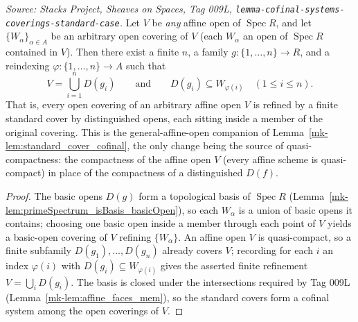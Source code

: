 \begin{lemma}\label{mk-lem:standard_cover_cofinal_affine}
  \leanok

  \textit{Source: Stacks Project, Sheaves on Spaces, Tag 009L,
  \texttt{lemma-cofinal-systems-coverings-standard-case}.}
  Let \(V\) be \emph{any} affine open of \(\operatorname{Spec} R\), and let \(\{W_\alpha\}_{\alpha \in A}\)
  be an arbitrary open covering of \(V\) (each \(W_\alpha\) an open of \(\operatorname{Spec} R\) contained
  in \(V\)). Then there exist a finite \(n\), a family \(g : \{1, \dots, n\} \to R\), and a reindexing
  \(\varphi : \{1, \dots, n\} \to A\) such that
  \[
    V = \bigcup_{i=1}^n D(g_i)
    \qquad\text{and}\qquad
    D(g_i) \subseteq W_{\varphi(i)} \quad (1 \le i \le n).
  \]
  That is, every open covering of an arbitrary affine open \(V\) is refined by a finite standard cover by
  distinguished opens, each sitting inside a member of the original covering. This is the
  general-affine-open companion of Lemma~\ref{mk-lem:standard_cover_cofinal}, the only change being the source
  of quasi-compactness: the compactness of the affine open \(V\) (every affine scheme is quasi-compact) in
  place of the compactness of a distinguished \(D(f)\).
\end{lemma}
\begin{proof}
  \leanok
  The basic opens \(D(g)\) form a topological basis of \(\operatorname{Spec} R\)
  (Lemma~\ref{mk-lem:primeSpectrum_isBasis_basicOpen}), so each \(W_\alpha\) is a union of basic opens it
  contains; choosing one basic open inside a member through each point of \(V\) yields a basic-open covering
  of \(V\) refining \(\{W_\alpha\}\). An affine open \(V\) is quasi-compact, so a finite subfamily
  \(D(g_1), \dots, D(g_n)\) already covers \(V\); recording for each \(i\) an index \(\varphi(i)\) with
  \(D(g_i) \subseteq W_{\varphi(i)}\) gives the asserted finite refinement \(V = \bigcup_i D(g_i)\). The
  basis is closed under the intersections required by Tag 009L (Lemma~\ref{mk-lem:affine_faces_mem}), so the
  standard covers form a cofinal system among the open coverings of \(V\).
\end{proof}

